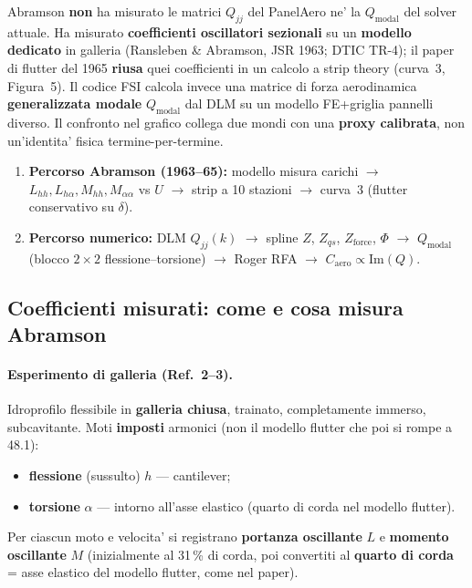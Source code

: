 \documentclass[11pt,a4paper]{article}
\begin{document}
Abramson \textbf{non} ha misurato le matrici $Q_{jj}$ del PanelAero ne' la
$Q_\mathrm{modal}$ del solver attuale. Ha misurato \textbf{coefficienti oscillatori sezionali}
su un \textbf{modello dedicato} in galleria (Ransleben \& Abramson, JSR 1963; DTIC TR-4);
il paper di flutter del 1965 \textbf{riusa} quei coefficienti in un calcolo a strip theory
(curva~3, Figura~5). Il codice FSI calcola invece una matrice di forza aerodinamica
\textbf{generalizzata modale} $Q_\mathrm{modal}$ dal DLM su un modello FE+griglia pannelli
diverso. Il confronto nel grafico collega due mondi con una \textbf{proxy calibrata}, non
un'identita' fisica termine-per-termine.

\begin{enumerate}
  \item \textbf{Percorso Abramson (1963--65):}
  modello misura carichi $\to$ $L_{hh},L_{h\alpha},M_{hh},M_{\alpha\alpha}$ vs $U$
  $\to$ strip a 10 stazioni $\to$ curva~3 (flutter conservativo su $\delta$).
  \item \textbf{Percorso numerico:}
  DLM $Q_{jj}(k)$ $\to$ spline $Z$, $Z_{qs}$, $Z_\mathrm{force}$, $\Phi$
  $\to$ $Q_\mathrm{modal}$ (blocco $2\times2$ flessione--torsione)
  $\to$ Roger RFA $\to$ $C_\mathrm{aero}\propto\mathrm{Im}(Q)$.
\end{enumerate}

\subsection{Coefficienti misurati: come e cosa misura Abramson}

\paragraph{Esperimento di galleria (Ref.~2--3).}
Idroprofilo flessibile in \textbf{galleria chiusa}, trainato, completamente immerso,
subcavitante. Moti \textbf{imposti} armonici (non il modello flutter che poi si rompe a
\SI{48.1}{\knunit}):
\begin{itemize}
  \item \textbf{flessione} (sussulto) $h$ --- cantilever;
  \item \textbf{torsione} $\alpha$ --- intorno all'asse elastico (quarto di corda nel modello
  flutter).
\end{itemize}
Per ciascun moto e velocita' si registrano \textbf{portanza oscillante} $L$ e
\textbf{momento oscillante} $M$ (inizialmente al 31\,\% di corda, poi convertiti al
\textbf{quarto di corda} = asse elastico del modello flutter, come nel paper).
\end{document}
